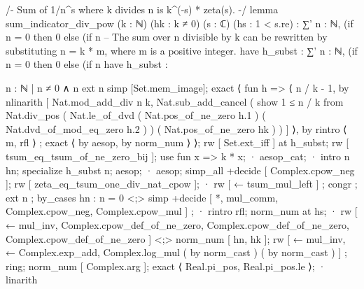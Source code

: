 /-
Sum of 1/n^s where k divides n is k^(-s) * zeta(s).
-/
lemma sum_indicator_div_pow (k : ℕ) (hk : k ≠ 0) (s : ℂ) (hs : 1 < s.re) :
  ∑' n : ℕ, (if n = 0 then 0 else (if n %
    -- The sum over n divisible by k can be rewritten by substituting n = k * m, where m is a positive integer.
    have h_subst : ∑' n : ℕ, (if n = 0 then 0 else (if n %
      have h_subst : {n : ℕ | n ≠ 0 ∧ n %
        ext n
        simp [Set.mem_image];
        exact ⟨ fun h => ⟨ n / k - 1, by nlinarith [ Nat.mod_add_div n k, Nat.sub_add_cancel ( show 1 ≤ n / k from Nat.div_pos ( Nat.le_of_dvd ( Nat.pos_of_ne_zero h.1 ) ( Nat.dvd_of_mod_eq_zero h.2 ) ) ( Nat.pos_of_ne_zero hk ) ) ] ⟩, by rintro ⟨ m, rfl ⟩ ; exact ⟨ by aesop, by norm_num ⟩ ⟩;
      rw [ Set.ext_iff ] at h_subst;
      rw [ tsum_eq_tsum_of_ne_zero_bij ];
      use fun x => k * x;
      · aesop_cat;
      · intro n hn; specialize h_subst n; aesop;
      · aesop;
    simp_all +decide [ Complex.cpow_neg ];
    rw [ zeta_eq_tsum_one_div_nat_cpow ];
    · rw [ ← tsum_mul_left ] ; congr ; ext n ; by_cases hn : n = 0 <;> simp +decide [ *, mul_comm, Complex.cpow_neg, Complex.cpow_mul ] ;
      · rintro rfl; norm_num at hs;
      · rw [ ← mul_inv, Complex.cpow_def_of_ne_zero, Complex.cpow_def_of_ne_zero, Complex.cpow_def_of_ne_zero ] <;> norm_num [ hn, hk ];
        rw [ ← mul_inv, ← Complex.exp_add, Complex.log_mul ( by norm_cast ) ( by norm_cast ) ] ; ring;
        norm_num [ Complex.arg ];
        exact ⟨ Real.pi_pos, Real.pi_pos.le ⟩;
    · linarith

}
